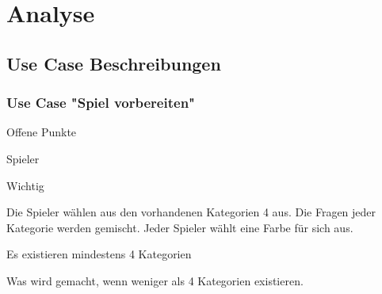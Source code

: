 \chapter{Analyse}\label{chap:Analyse}

\section{Use Case Beschreibungen}

\subsection{Use Case "Spiel vorbereiten"}
\begin{labeling}[:]{Offene Punkte}
\item [Akteure] Spieler
\item [Priorität] Wichtig
\item [Beschreibung] Die Spieler wählen aus den vorhandenen Kategorien 4 aus. Die Fragen jeder Kategorie werden gemischt. Jeder Spieler wählt eine Farbe für sich aus.
\item [Vorbedigungen] Es existieren mindestens 4 Kategorien
\item [Offene Punkte] Was wird gemacht, wenn weniger als 4 Kategorien existieren.
\end{labeling}

